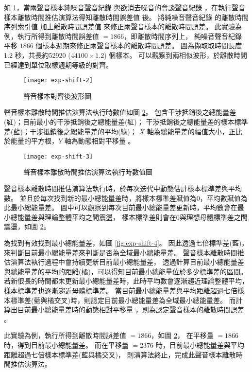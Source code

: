     如 \ref{fig:exp-shift-2}，當兩聲音樣本純噪音聲音紀錄 \DEFrecN
與欲消去噪音的會談聲音紀錄 \DEFrecJ，在執行聲音樣本離散時間推估演算法得知離散時間誤差值 \DEFshift 後。
將純噪音聲音紀錄 \DEFrecN 的離散時間序列索引值 \DEFpause 加上離散時間誤差值 \DEFshift
來修正兩聲音樣本的離散時間誤差。
此實驗為例，執行所得到離散時間誤差值 \DEFshift $=1866$，即離散時間序列上，
純噪音聲音紀錄 \DEFrecN 平移 $1866$ 個樣本週期來修正兩聲音樣本的離散時間誤差。
圖為擷取取時間長度 1.2 秒，共長約52920 ($44100 \times 1.2 $) 個樣本。
可以觀察到兩相似波形，於離散時間已經達到單位取樣週期等級的對齊。

\begin{figure}[H]
    \centering
    \texttt{[image: exp-shift-2]}
    \caption{聲音樣本對齊後波形圖}\label{fig:exp-shift-2}
\end{figure}

    聲音樣本離散時間推估演算法執行時數值如圖 \ref{fig:exp-shift-3}。
包含干涉抵銷後之總能量差(紅)；目前最小的干涉抵銷後之總能量差(紅)；
干涉抵銷後之總能量差的樣本標準差(藍)；干涉抵銷後之總能量差的平均(綠)；
$X$ 軸為總能量差的幅值大小，正比於能量的平方根，$Y$ 軸為動態相對平移量 \DEFcandiSFT。

\begin{figure}[H]
    \centering
    \texttt{[image: exp-shift-3]}
    \caption{聲音樣本離散時間推估演算法執行時數值圖}\label{fig:exp-shift-3}
\end{figure}

    聲音樣本離散時間推估演算法執行時，於每次迭代中動態估計樣本標準差與平均數。
並且於每次找到新的最小總能量差時，將樣本標準差賦值為$0$，平均數賦值為此最小總能量差。
圖中可以觀察到每次目前最小總能量差更新時，平均數會在最小總能量差與理論整體平均之間震盪，
樣本標準差則會在$0$與理想母體標準差之間震盪，如圖 \ref{fig:exp-shift-3}。

    為找到有效找到最小總能量差，如圖 \ref{fig:exp-shift-4}。
因此透過七倍標準差(藍)，來判斷目前最小總能量差來判斷是否為全域最小總能量差。
聲音樣本離散時間推估演算法執行過程中會持續更新目前最小總能量差，
透過計算目前最小總能量差與總能量差的平均的距離(橘)，可以得知目前最小總能量位於多少標準差的區間。
若新很長的時間都未更新最小總能量差時，此時平均數會逐漸趨近理論整體平均，樣本標準差也逐漸趨近母體標準差。
當目前最小總能量差與平均距離超過七倍樣本標準差(藍與橘交叉)時，則認定目前最小總能量差為全域最小總能量差。
而計算出目前最小總能量差時的動態相對平移量 \DEFcandiSFT，則為認定聲音樣本的離散時間誤差 \DEFshift。

    此實驗為例，執行所得到離散時間誤差值 \DEFshift $=1866$，如圖 \ref{fig:exp-shift-3}，
在平移量 \DEFcandiSFT $=1866$ 時，得到目前最小總能量差。
而在平移量 \DEFcandiSFT $=2376$ 時，目前最小總能量差與平均距離超過七倍樣本標準差(藍與橘交叉)，
則演算法終止，完成此聲音樣本離散時間推估演算法。

